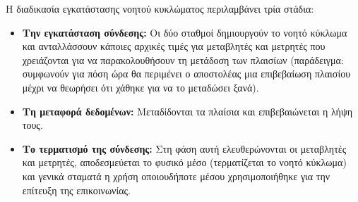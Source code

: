 \begin{itemize}
Η διαδικασία εγκατάστασης νοητού κυκλώματος περιλαμβάνει τρία στάδια:
\begin{itemize}
\item \textbf{Την εγκατάσταση σύνδεσης:} Οι δύο σταθμοί δημιουργούν το νοητό κύκλωμα και ανταλλάσσουν κάποιες αρχικές τιμές για μεταβλητές και μετρητές που χρειάζονται για να παρακολουθήσουν τη μετάδοση των πλαισίων (παράδειγμα: συμφωνούν για πόση ώρα θα περιμένει ο αποστολέας μια επιβεβαίωση πλαισίου μέχρι να θεωρήσει ότι χάθηκε για να το μεταδώσει ξανά).
\item \textbf{Τη μεταφορά δεδομένων:} Μεταδίδονται τα πλαίσια και επιβεβαιώνεται η λήψη τους.
\item \textbf{Το τερματισμό της σύνδεσης:} Στη φάση αυτή ελευθερώνονται οι μεταβλητές και μετρητές, αποδεσμεύεται το φυσικό μέσο (τερματίζεται το νοητό κύκλωμα) και γενικά σταματά η χρήση οποιουδήποτε μέσου χρησιμοποιήθηκε για την επίτευξη της επικοινωνίας.
\end{itemize}
\end{itemize}